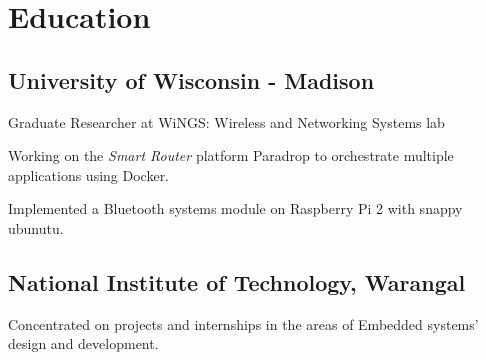 \documentclass[letterpaper]{deedy-resume} %
\begin{document}
%
%
\begin{minipage}[t]{0.76\textwidth} %



\section{Education}

\subsection{University of Wisconsin - Madison}
\vspace{\topsep} %
\begin{tightitemize}
\item Graduate Researcher at WiNGS: Wireless and Networking Systems lab
\item Working on the \textit{Smart Router} platform Paradrop to orchestrate multiple applications using Docker.
\item Implemented a Bluetooth systems module on Raspberry Pi 2 with snappy ubunutu.
\end{tightitemize}

\sectionspace %
\vspace{1 mm}
\subsection{National Institute of Technology, Warangal}
\begin{tightitemize}
\item Concentrated on projects and internships in the areas of Embedded systems' design and development.
\end{tightitemize}



\end{minipage}
\end{document}
